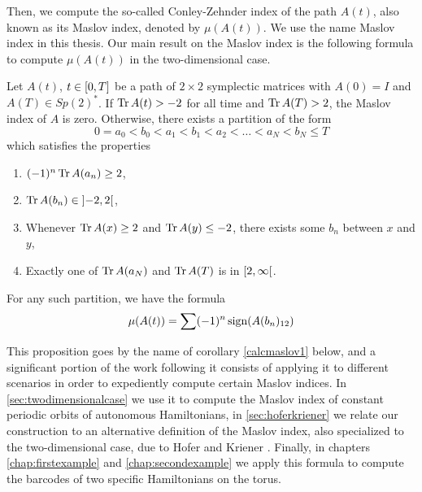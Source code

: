 Then, we compute the so-called Conley-Zehnder index of the path $A(t)$, also known as its Maslov index, denoted by $\mu(A(t))$. We use the name Maslov index in this thesis. Our main result on the Maslov index is the following formula to compute $\mu(A(t))$ in the two-dimensional case.
\begin{prop*}
Let $A(t)$, $t \in \interval 0 T$ be a path of $2 \times 2$ symplectic matrices with $A(0) = I$ and $A(T) \in Sp(2)^*$. If $\operatorname{Tr} A(t) > -2$ for all time and $\operatorname{Tr} A(T) > 2$, the Maslov index of $A$ is zero. Otherwise, there exists a partition of the form
\begin{equation*}
0 = a_0 < b_0 < a_1 < b_1 < a_2 < \dots < a_N < b_N \leq T
\end{equation*}
which satisfies the properties
\begin{enumerate}
\item $(-1)^n \operatorname{Tr} A(a_n) \geq 2$,
\item $\trace A(b_n) \in \ointerval{-2}2$,
\item Whenever $\operatorname{Tr} A(x) \geq 2$ and $\operatorname{Tr} A(y) \leq -2$, there exists some $b_n$ between $x$ and $y$,
\item Exactly one of $\operatorname{Tr} A(a_N)$ and $\operatorname{Tr} A(T)$ is in $\rinterval 2 \infty$.
\end{enumerate}

For any such partition, we have the formula
\begin{equation*}
\mu(A(t)) = \sum (-1)^n \operatorname{sign}(A(b_n)_{12})
\end{equation*}
\end{prop*}
This proposition goes by the name of corollary \ref{calcmaslov1} below, and a significant portion of the work following it consists of applying it to different scenarios in order to expediently compute certain Maslov indices.  In \ref{sec:twodimensionalcase} we use it to compute the Maslov index of constant periodic orbits of autonomous Hamiltonians, in \ref{sec:hoferkriener} we relate our construction to an alternative definition of the Maslov index, also specialized to the two-dimensional case, due to Hofer and Kriener \cite{hoferkriener}. Finally, in chapters \ref{chap:firstexample} and \ref{chap:secondexample} we apply this formula to compute the barcodes of two specific Hamiltonians on the torus.
